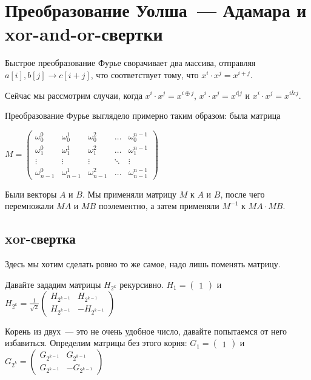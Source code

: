 \chapter{Преобразование Уолша~--- Адамара и xor-and-or-свертки}


Быстрое преобразование Фурье сворачивает два массива, отправляя $a[i], b[j] \to c[i + j]$,
что соответствует тому, что $x^i \cdot x^j = x^{i + j}$.

Сейчас мы рассмотрим случаи, когда
$x^i \cdot x^j = x^{i \oplus j}$, $x^i \cdot x^j = x^{i | j}$ и $x^i \cdot x^j = x^{i \& j}$.

Преобразование Фурье выглядело примерно таким образом: была матрица

$M = 
\begin{pmatrix}
    \omega_0^0 & \omega_0^1 & \omega_0^2 & \ldots & \omega_0^{n - 1}\\
    \omega_1^0 & \omega_1^1 & \omega_1^2 & \ldots & \omega_1^{n - 1}\\
    \vdots & \vdots & \vdots & \ddots & \vdots\\
    \omega_{n - 1}^0 & \omega_{n - 1}^1 & \omega_{n - 1}^2 & \ldots & \omega_{n - 1}^{n - 1}
\end{pmatrix}
$

Были векторы $A$ и $B$. Мы применяли матрицу $M$ к $A$ и $B$, после чего
перемножали $MA$ и $MB$ поэлементно, а затем применяли $M^{-1}$ к $MA \cdot MB$.

\section{xor-свертка}

Здесь мы хотим сделать ровно то же самое, надо лишь поменять матрицу.

Давайте зададим матрицы $H_{2^k}$ рекурсивно.
$H_1 = 
\begin{pmatrix}
    1
\end{pmatrix}$ и
$H_{2^k} = \frac{1}{\sqrt{2}}
\begin{pmatrix}
    H_{2^{k - 1}} & H_{2^{k - 1}}\\
    H_{2^{k - 1}} & -H_{2^{k - 1}}
\end{pmatrix}
$

Корень из двух~--- это не очень удобное число, давайте попытаемся от него избавиться.
Определим матрицы без этого корня:
$G_1 = 
\begin{pmatrix}
    1
\end{pmatrix}$ и
$G_{2^k} =
\begin{pmatrix}
    G_{2^{k - 1}} & G_{2^{k - 1}}\\
    G_{2^{k - 1}} & -G_{2^{k - 1}}
\end{pmatrix}
$

